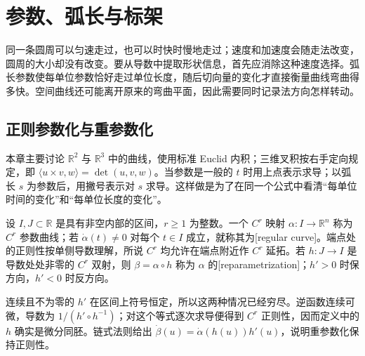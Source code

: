 
% 
% 

\section{参数、弧长与标架}
\label{g1:sec:0701}

同一条圆周可以匀速走过，也可以时快时慢地走过；速度和加速度会随走法改变，圆周的大小却没有改变。要从导数中提取形状信息，首先应消除这种速度选择。弧长参数使每单位参数恰好走过单位长度，随后切向量的变化才直接衡量曲线弯曲得多快。空间曲线还可能离开原来的弯曲平面，因此需要同时记录法方向怎样转动。

\subsection{正则参数化与重参数化}
\label{g1:subsec:0701:01}

本章主要讨论 \(\mathbb R^2\) 与 \(\mathbb R^3\) 中的曲线，使用标准 Euclid 内积；三维叉积按右手定向规定，即 \(\langle u\times v,w\rangle=\det(u,v,w)\)。当参数是一般的 \(t\) 时用上点表示求导；以弧长 \(s\) 为参数后，用撇号表示对 \(s\) 求导。这样做是为了在同一个公式中看清“每单位时间的变化”和“每单位长度的变化”。

\begin{definition}\label{g1:def:regular-curve}
	设 \(I,J\subset\mathbb R\) 是具有非空内部的区间，\(r\ge1\) 为整数。一个 \(C^r\) 映射 \(\alpha:I\to\mathbb R^n\) 称为 \(C^r\) 参数曲线；若 \(\dot\alpha(t)\ne0\) 对每个 \(t\in I\) 成立，就称其为[regular curve]。端点处的正则性按单侧导数理解，所说 \(C^r\) 均允许在端点附近作 \(C^r\) 延拓。若 \(h:J\to I\) 是导数处处非零的 \(C^r\) 双射，则 \(\beta=\alpha\circ h\) 称为 \(\alpha\) 的[reparametrization]；\(h'>0\) 时保方向，\(h'<0\) 时反方向。
\end{definition}

连续且不为零的 \(h'\) 在区间上符号恒定，所以这两种情况已经穷尽。逆函数连续可微，导数为 \(1/(h'\circ h^{-1})\)；对这个等式逐次求导便得到 \(C^r\) 正则性，因而定义中的 \(h\) 确实是微分同胚。链式法则给出 \(\dot\beta(u)=\dot\alpha(h(u))h'(u)\)，说明重参数化保持正则性。

\ProseParagraphBreak

